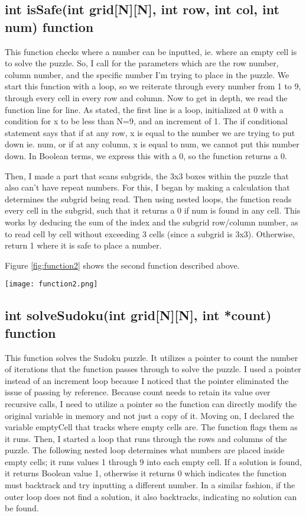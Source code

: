 \documentclass{report}
\begin{document}
\subsection{int isSafe(int grid[N][N], int row, int col, int num) function}

This function checks where a number can be inputted, ie. where an empty cell is to solve the puzzle. So, I call for the parameters which are the row number, column number, and the specific number I'm trying to place in the puzzle. We start this function with a loop, so we reiterate through every number from 1 to 9, through every cell in every row and column. Now to get in depth, we read the function line for line. As stated, the first line is a loop, initialized at 0 with a condition for x to be less than N=9, and an increment of 1. The if conditional statement says that if at any row, x is equal to the number we are trying to put down ie. num, or if at any  column, x is equal to num, we cannot put this number down. In Boolean terms, we express this with a 0, so the function returns a 0. 

Then, I made a part that scans subgrids, the 3x3 boxes within the puzzle that also can't have repeat numbers. For this, I began by making a calculation that determines the subgrid being read. Then using nested loops, the function reads every cell in the subgrid, such that it returns a 0 if num is found in any cell. This works by deducing the sum of the index and the subgrid row/column number, as to read cell by cell without exceeding 3 cells (since a subgrid is 3x3). Otherwise, return 1 where it is safe to place a number.

\centerline{Figure \ref{fig:function2} shows the second function described above.}
  \begin{center}
  \texttt{[image: function2.png]}
  \label{fig:function2}
  \end{center}

\subsection{int solveSudoku(int grid[N][N], int *count) function}
This function solves the Sudoku puzzle. It utilizes a pointer to count the number of iterations that the function passes through to solve the puzzle. I used a pointer instead of an increment loop because I noticed that the pointer eliminated the issue of passing by reference. Because count needs to retain its value over recursive calls, I need to utilize a pointer so the function can directly modify the original variable in memory and not just a copy of it. Moving on, I declared the variable emptyCell that tracks where empty cells are. The function flags them as it runs. Then, I started a loop that runs through the rows and columns of the puzzle. The following nested loop determines what numbers are placed inside empty cells; it runs values 1 through 9 into each empty cell. If a solution is found, it returns Boolean value 1, otherwise it returns 0 which indicates the function must backtrack and try inputting a different number. In a similar fashion, if the outer loop does not find a solution, it also backtracks, indicating no solution can be found. 
\end{document}

